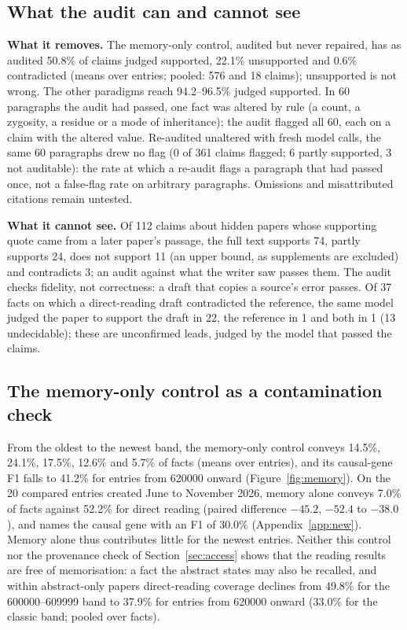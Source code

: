 \documentclass{article} %
\begin{document}
\subsection{What the audit can and cannot see}
\label{sec:audit}
\textbf{What it removes.} The memory-only control, audited but never repaired, has as audited 50.8\% of claims judged supported, 22.1\% unsupported and 0.6\% contradicted (means over entries; pooled: 576 and 18 claims); unsupported is not wrong. The other paradigms reach 94.2--96.5\% judged supported. In 60 paragraphs the audit had passed, one fact was altered by rule (a count, a zygosity, a residue or a mode of inheritance); the audit flagged all 60, each on a claim with the altered value. Re-audited unaltered with fresh model calls, the same 60 paragraphs drew no flag (0 of 361 claims flagged; 6 partly supported, 3 not auditable): the rate at which a re-audit flags a paragraph that had passed once, not a false-flag rate on arbitrary paragraphs. Omissions and misattributed citations remain untested.

\textbf{What it cannot see.} Of 112 claims about hidden papers whose supporting quote came from a later paper's passage, the full text supports 74, partly supports 24, does not support 11 (an upper bound, as supplements are excluded) and contradicts 3; an audit against what the writer saw passes them. The audit checks fidelity, not correctness: a draft that copies a source's error passes. Of 37 facts on which a direct-reading draft contradicted the reference, the same model judged the paper to support the draft in 22, the reference in 1 and both in 1 (13 undecidable); these are unconfirmed leads, judged by the model that passed the claims.

\subsection{The memory-only control as a contamination check}
\label{sec:memory}
From the oldest to the newest band, the memory-only control conveys 14.5\%, 24.1\%, 17.5\%, 12.6\% and 5.7\% of facts (means over entries), and its causal-gene F1 falls to 41.2\% for entries from 620000 onward (Figure~\ref{fig:memory}). On the 20 compared entries created June to November 2026, memory alone conveys 7.0\% of facts against 52.2\% for direct reading (paired difference $-45.2$, $-52.4$ to $-38.0$), and names the causal gene with an F1 of 30.0\% (Appendix~\ref{app:new}). Memory alone thus contributes little for the newest entries. Neither this control nor the provenance check of Section~\ref{sec:access} shows that the reading results are free of memorisation: a fact the abstract states may also be recalled, and within abstract-only papers direct-reading coverage declines from 49.8\% for the 600000--609999 band to 37.9\% for entries from 620000 onward (33.0\% for the classic band; pooled over facts).
\end{document}

